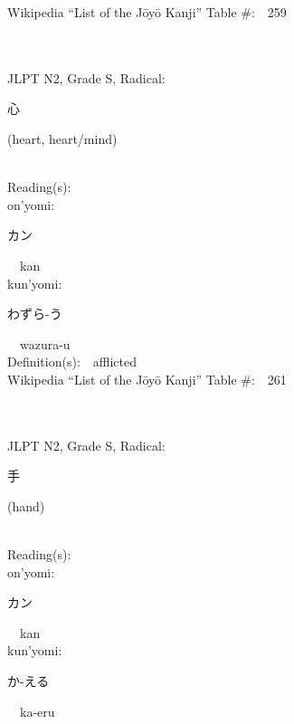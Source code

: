 \begin{multicols}{2}
Wikipedia ``List of the J\=oy\=o Kanji'' Table \#:\ \ 259 \\
\ \ \\
{\fontsize{34pt}{40pt}  }\ \ \\  %
{JLPT N2, Grade S, Radical:\ \ {\begin{CJK}{UTF8}{min} 心 \end{CJK}} (heart, heart/mind) } \\
Reading(s):\ \ \\
{\hspace*{1em}}on'yomi:\ \ \\
{\hspace*{2em}}{\begin{CJK}{UTF8}{min} カン \end{CJK}}\ \ kan\ \ \\
{\hspace*{1em}}kun'yomi:\ \ \\
{\hspace*{2em}}{\begin{CJK}{UTF8}{min} わずら-う \end{CJK}}\ \ wazura-u\ \ \\
Definition(s):\ \ afflicted \\
Wikipedia ``List of the J\=oy\=o Kanji'' Table \#:\ \ 261 \\
\ \ \\
{\fontsize{34pt}{40pt}  }\ \ \\  %
{JLPT N2, Grade S, Radical:\ \ {\begin{CJK}{UTF8}{min} 手 \end{CJK}} (hand) } \\
Reading(s):\ \ \\
{\hspace*{1em}}on'yomi:\ \ \\
{\hspace*{2em}}{\begin{CJK}{UTF8}{min} カン \end{CJK}}\ \ kan\ \ \\
{\hspace*{1em}}kun'yomi:\ \ \\
{\hspace*{2em}}{\begin{CJK}{UTF8}{min} か-える \end{CJK}}\ \ ka-eru\ \ \\

\end{multicols}
